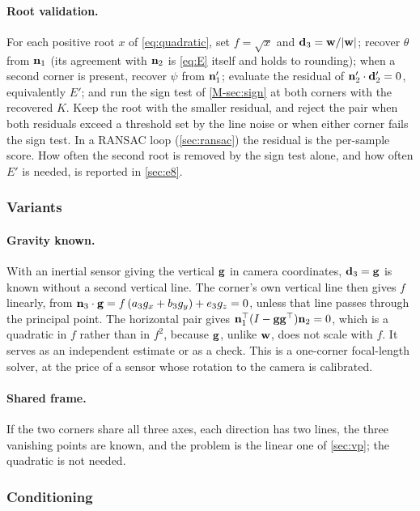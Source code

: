 \paragraph{Root validation.} For each positive root $x$ of \eqref{eq:quadratic}, set $f=\sqrt{x}$ and $\mathbf{d}_3=\mathbf{w}/|\mathbf{w}|$; recover $\theta$ from $\mathbf{n}_1$ (its agreement with $\mathbf{n}_2$ is \eqref{eq:E} itself and holds to rounding); when a second corner is present, recover $\psi$ from $\mathbf{n}_1'$; evaluate the residual of $\mathbf{n}_2'\cdot\mathbf{d}_2'=0$, equivalently $E'$; and run the sign test of \cref{M-sec:sign} at both corners with the recovered $K$. Keep the root with the smaller residual, and reject the pair when both residuals exceed a threshold set by the line noise or when either corner fails the sign test. In a RANSAC loop (\cref{sec:ransac}) the residual is the per-sample score. How often the second root is removed by the sign test alone, and how often $E'$ is needed, is reported in \cref{sec:e8}.

\subsubsection{Variants}\label{sec:variants}

\paragraph{Gravity known.} With an inertial sensor giving the vertical $\mathbf{g}$ in camera coordinates, $\mathbf{d}_3=\mathbf{g}$ is known without a second vertical line. The corner's own vertical line then gives $f$ linearly, from $\mathbf{n}_3\cdot\mathbf{g}=f\,(a_3g_x+b_3g_y)+e_3g_z=0$, unless that line passes through the principal point. The horizontal pair gives $\mathbf{n}_1^{\top}(I-\mathbf{g}\mathbf{g}^{\top})\mathbf{n}_2=0$, which is a quadratic in $f$ rather than in $f^2$, because $\mathbf{g}$, unlike $\mathbf{w}$, does not scale with $f$. It serves as an independent estimate or as a check. This is a one-corner focal-length solver, at the price of a sensor whose rotation to the camera is calibrated.

\paragraph{Shared frame.} If the two corners share all three axes, each direction has two lines, the three vanishing points are known, and the problem is the linear one of \cref{sec:vp}; the quadratic is not needed.

\subsubsection{Conditioning}\label{sec:conditioning}

